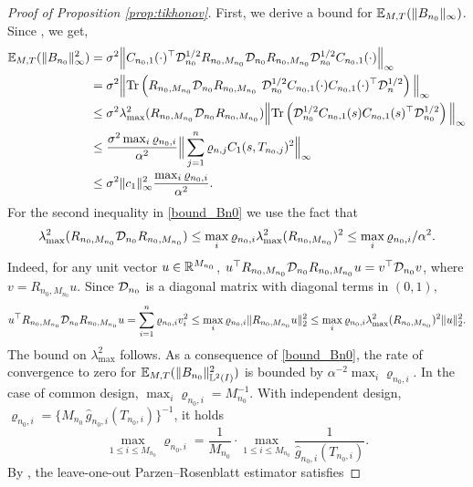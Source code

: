 \documentclass{article}
\begin{document}
\begin{proof}[Proof of Proposition \ref{prop:tikhonov}]
First, we derive a bound for $\mathbb{E}_{M,T}(\|B_{n_0}\|_{\infty} )$.
Since , we get,
\begin{align}\label{bound_Bn0}
\mathbb{E}_{M,T}(\|B_{n_0}\|^2_{\infty}) &= \sigma^2\Big\| C_{n_0,1}(\cdot)^\top \mathcal{D}^{1/2}_{n_0} R_{n_0,M_{n_0}} \mathcal{D}_{n_0} R_{n_0,M_{n_0}}\mathcal{D}^{1/2}_{n_0} C_{n_0,1}(\cdot )\Big\|_\infty \\
&  = \sigma^2 \Big\|  \mathrm{Tr}\left(R_{n_0,M_{n_0}} \mathcal{D}_{n_0} R_{n_0,M_{n_0}}\  \mathcal{D}^{1/2}_{n_0}C_{n_0,1}(\cdot)C_{n_0,1}(\cdot)^\top \mathcal{D}^{1/2}_{n} \right) \Big\|_\infty\\
&\leq  \sigma^2\lambda^2_{\max} (R_{n_0,M_{n_0}} \mathcal{D}_{n_0} R_{n_0,M_{n_0}}) \Big\| \mathrm{Tr}\left(\mathcal{D}^{1/2}_{n_0} C_{n_0,1}(s)C_{n_0,1}(s)^\top\mathcal{D}^{1/2}_{n_0} \right) \Big\|_\infty \\
& \leq \frac{\sigma^2 \max_{i}\varrho_{n_0,i}}{\alpha^2} \Big\|  \sum_{j=1}^n \varrho_{n,j} C_1(s,T_{n_0,j})^2 \Big\|_\infty \\
& \leq  \sigma^2\|c_1\|^2_\infty \frac{\max_{i}\varrho_{n_0,i} }{\alpha^2 }.
\end{align}
For the second inequality in \eqref{bound_Bn0} we use the fact that 
$$
\lambda^2_{\max} (R_{n_0,M_{n_0}} \mathcal{D}_{n_0} R_{n_0,M_{n_0}})\leq \max_{i}\varrho_{n_0,i} \lambda^2_{\max} (R_{n_0,M_{n_0}})^2\leq \max_{i}\varrho_{n_0,i} /\alpha^2.
$$ 
Indeed, for any unit vector $u\in\mathbb{R}^{M_{n_0}}$, $u^\top R_{n_0,M_{n_0}} \mathcal{D}_{n_0} R_{n_0,M_{n_0}} u = v^\top  \mathcal{D}_{n_0} v$, where $v=R_{n_0,M_{n_0}} u.$ 
Since $ \mathcal{D}_{n_0}$ is a diagonal matrix with diagonal terms in $(0,1),$
$$
	u^\top R_{n_0,M_{n_0}} \mathcal{D}_{n_0} R_{n_0,M_{n_0}} u = \sum_{i=1}^n \varrho_{n_0,i} v_i^2 \leq \max_{i}\varrho_{n_0,i} \| R_{n_0,M_{n_0}} u \|_2^2 \leq \max_{i}\varrho_{n_0,i} \lambda^2_{\max} (R_{n_0,M_{n_0}})^2 \|u\|_2^2.
$$
The bound on $\lambda^2_{\max}$ follows. As a consequence of \eqref{bound_Bn0}, the rate of convergence to zero for $\mathbb{E}_{M,T}(\|B_{n_0}\|^2_{\mathbb{L}^2(I)}) $ is bounded by $\alpha^{-2}\max_{i}\varrho_{n_0,i} $. 
In the case of common design, $\max_{i}\varrho_{n_0,i} = M_{n_0}^{-1}$.
\color{red}
With independent design,  $\varrho_{n_0,i} = \{M_{n_0} \,\widehat{g}_{n_0,i}(T_{n_0,i})\}^{-1}$, it holds 
$$
\max_{1\leq i \leq M_{n_0}} \varrho_{n_0,i} = \frac{1}{M_{n_0}} \cdot \max_{1\leq i \leq M_{n_0}} \frac{1}{\widehat{g}_{n_0,i}(T_{n_0,i})}.
$$
By \cite{gine_2002}, the leave-one-out Parzen–Rosenblatt estimator satisfies

\end{proof}
\end{document}
